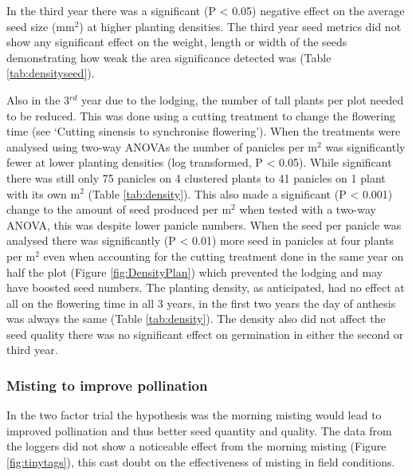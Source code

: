 \documentclass[fleqn, 15pt, lineno]{olplainarticle}
\begin{document}
In the third year there was a significant (P < 0.05) negative effect on the average seed size (mm$^2$) at higher planting densities.
The third year seed metrics did not show any significant effect on the weight, length or width of the seeds demonstrating how weak the area significance detected was (Table \ref{tab:densityseed}).

Also in the 3$^{rd}$ year due to the lodging, the number of tall plants per plot needed to be reduced.
This was done using a cutting treatment to change the flowering time (see `Cutting sinensis to synchronise flowering').
When the treatments were analysed using two-way ANOVAs the number of panicles per m$^2$ was significantly fewer at lower planting densities (log transformed, P < 0.05).
While significant there was still only 75 panicles on 4 clustered plants to 41 panicles on 1 plant with its own m$^2$ (Table \ref{tab:density}).
This also made a significant (P < 0.001) change to the amount of seed produced per m$^2$ when tested with a two-way ANOVA, this was despite lower panicle numbers.
When the seed per panicle was analysed there was significantly (P < 0.01) more seed in panicles at four plants per m$^2$ even when accounting for the cutting treatment done in the same year on half the plot (Figure \ref{fig:DensityPlan}) which prevented the lodging and may have boosted seed numbers.
The planting density, as anticipated, had no effect at all on the flowering time in all 3 years, in the first two years the day of anthesis was always the same (Table \ref{tab:density}).
The density also did not affect the seed quality there was no significant effect on germination in either the second or third year.



\FloatBarrier
\subsubsection{Misting to improve pollination}
In the two factor trial the hypothesis was the morning misting would lead to improved pollination and thus better seed quantity and quality.
The data from the loggers did not show a noticeable effect from the morning misting (Figure \ref{fig:tinytags}), this cast doubt on the effectiveness of misting in field conditions.
\end{document}
